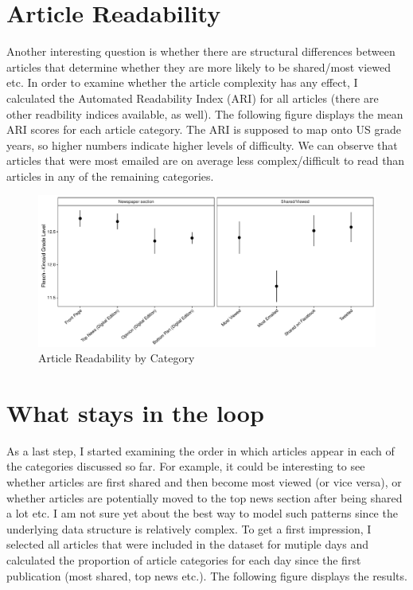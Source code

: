 \documentclass[12pt]{article}
\begin{document}
\begin{doublespace}
\section{Article Readability}

Another interesting question is whether there are structural differences between articles that determine whether they are more likely to be shared/most viewed etc. In order to examine whether the article complexity has any effect, I calculated the Automated Readability Index (ARI) for all articles (there are other readbility indices available, as well). The following figure displays the mean ARI scores for each article category. The ARI is supposed to map onto US grade years, so higher numbers indicate higher levels of difficulty. We can observe that articles that were most emailed are on average less complex/difficult to read than articles in any of the remaining categories.

\begin{figure}
\caption{Article Readability by Category}\label{fig:readability}
\includegraphics[width=\textwidth]{../calc/fig/readability} 
\end{figure}




\section{What stays in the loop}

As a last step, I started examining the order in which articles appear in each of the categories discussed so far. For example, it could be interesting to see whether articles are first shared and then become most viewed (or vice versa), or whether articles are potentially moved to the top news section after being shared a lot etc. I am not sure yet about the best way to model such patterns since the underlying data structure is relatively complex. To get a first impression, I selected all articles that were included in the dataset for mutiple days and calculated the proportion of article categories for each day since the first publication (most shared, top news etc.). The following figure displays the results.


\end{doublespace}
\end{document}
